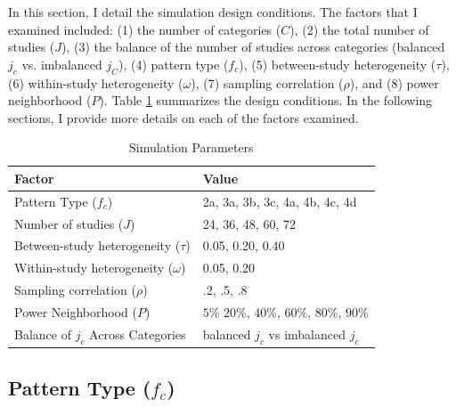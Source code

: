 In this section, I detail the simulation design conditions. The factors that I examined included: (1) the number of categories ($C$), (2) the total number of studies ($J$), (3) the balance of the number of studies across categories (balanced $j_c$ vs. imbalanced $j_C$), (4) pattern type ($f_c$), (5) between-study heterogeneity ($\tau$), (6) within-study heterogeneity ($\omega$), (7) sampling correlation ($\rho$), and (8) power neighborhood ($P$). Table \ref{tab:experimentalconditions} summarizes the design conditions. In the following sections, I provide more details on each of the factors examined. 


\begin{table}[H]
\caption{Simulation Parameters}
     \label{tab:experimentalconditions}
    \centering
    \begin{tabular}{p{7cm}p{7cm}}
        \toprule
    Factor & Value \\ \midrule

       Pattern Type ($f_c$)  & 2a, 3a, 3b, 3c, 4a, 4b, 4c, 4d \\
       Number of studies ($J$)  & 24, 36, 48, 60, 72  \\ 
       Between-study heterogeneity ($\tau$)  & 0.05, 0.20, 0.40 \\
       Within-study heterogeneity ($\omega$) & 0.05, 0.20 \\
       Sampling correlation ($\rho$) & .2, .5, .8 \\
       Power Neighborhood ($P$) & $5\%$ $20\%$, $40\%$, $60\%$, $80\%$, $90\%$ \\
       Balance of $j_c$ Across Categories & balanced $j_c$ vs imbalanced $j_c$ \\
        \bottomrule
    \end{tabular}
    \small
\end{table}


\subsection{Pattern Type \texorpdfstring{($f_c$)}{ }} \label{sec: Pattern Type}


